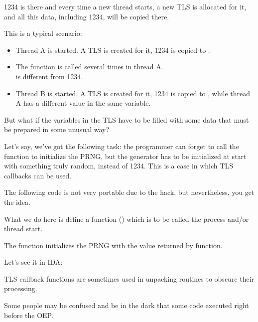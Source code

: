 1234 is there and every time a new thread starts, a new \ac{TLS} is allocated for it, 
and all this data, including 1234, will be copied there.

This is a typical scenario:

\begin{itemize}
\item Thread A is started. A \ac{TLS} is created for it, 1234 is copied to .

\item The  function is called several times in thread A.\\
 is different from 1234.

\item Thread B is started. A \ac{TLS} is created for it, 1234 is copied to , 
while thread A has a different value in the same variable.
\end{itemize}


But what if the variables in the \ac{TLS} have to be filled with some data that must be prepared in some unusual way?

Let's say, we've got the following task:
the programmer can forget to call the  function to initialize the \ac{PRNG}, but the generator has to be 
initialized at start with something truly random, instead of 1234.
This is a case in which \ac{TLS} callbacks can be used.

The following code is not very portable due to the hack, but nevertheless, you get the idea.

What we do here is define a function () which is to be called  
the process and/or thread start.

The function initializes the \ac{PRNG} with the value returned by  function.



Let's see it in IDA:



TLS callback functions are sometimes used in unpacking routines to obscure their processing.

Some people may be confused and be in the dark that some code executed right before the \ac{OEP}.
